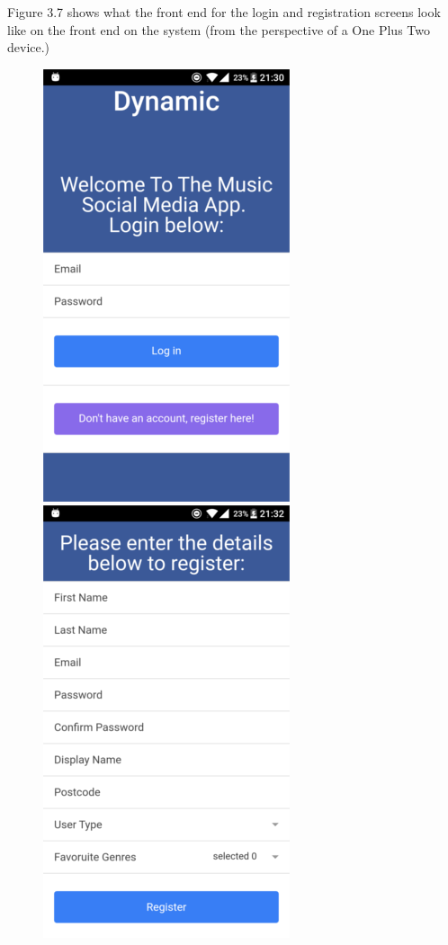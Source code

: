 Figure 3.7 shows what the front end for the login and registration screens look like on the front end on the system (from the perspective of a One Plus Two device.)
\begin{center}
\begin{figure}[H]
\includegraphics[scale=0.5]{images/sc1}
\includegraphics[scale=0.5]{images/sc2}

\end{figure}
\end{center}
